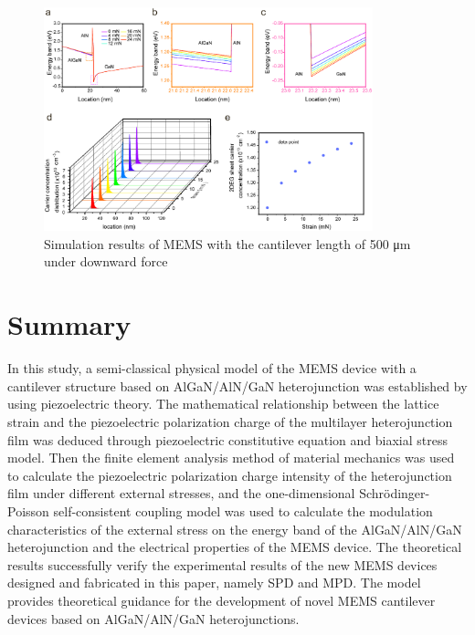 \begin{figure}[H] 
\centering    
\includegraphics[width=0.85\textwidth]{ch2_500}
\caption[Simulation results of MEMS with the cantilever length of 500 \unit{\um} under downward force]{Simulation results of MEMS with the cantilever length of 500 \unit{\um} under downward force}
\label{fig:2.500}
\end{figure}

\section{Summary}
In this study, a semi-classical physical model of the MEMS  device with a cantilever  structure based on AlGaN/AlN/GaN heterojunction was established by using piezoelectric theory. The mathematical relationship between the lattice strain  and the piezoelectric polarization charge  of the multilayer heterojunction film was deduced through piezoelectric constitutive equation  and  biaxial stress model. Then the finite element analysis  method of material mechanics was used to calculate the piezoelectric polarization charge intensity  of the heterojunction film under different external stresses, and the one-dimensional Schrödinger-Poisson self-consistent coupling model was used to calculate the modulation  characteristics of the external stress on the energy band of the AlGaN/AlN/GaN heterojunction  and the electrical properties of the  MEMS device. The theoretical results successfully verify the experimental results of the new MEMS devices designed and fabricated in this paper, namely SPD and MPD. The model provides theoretical guidance for the development of novel MEMS cantilever  devices based on  AlGaN/AlN/GaN heterojunctions.

